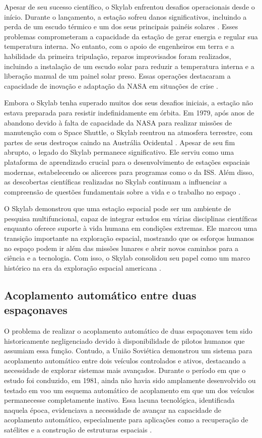 Apesar de seu sucesso científico, o Skylab enfrentou desafios operacionais desde o início. Durante o lançamento, a estação sofreu danos significativos, incluindo a perda de um escudo térmico e um dos seus principais painéis solares \citep{nasaSkylab2}. Esses problemas comprometeram a capacidade da estação de gerar energia e regular sua temperatura interna. No entanto, com o apoio de engenheiros em terra e a habilidade da primeira tripulação, reparos improvisados foram realizados, incluindo a instalação de um escudo solar para reduzir a temperatura interna e a liberação manual de um painel solar preso. Essas operações destacaram a capacidade de inovação e adaptação da NASA em situações de crise \citep{nasaSkylab}.

Embora o Skylab tenha superado muitos dos seus desafios iniciais, a estação não estava preparada para resistir indefinidamente em órbita. Em 1979, após anos de abandono devido à falta de capacidade da NASA para realizar missões de manutenção com o Space Shuttle, o Skylab reentrou na atmosfera terrestre, com partes de seus destroços caindo na Austrália Ocidental \citep{nasaSkylabReentry}. Apesar de seu fim abrupto, o legado do Skylab permanece significativo. Ele serviu como uma plataforma de aprendizado crucial para o desenvolvimento de estações espaciais modernas, estabelecendo os alicerces para programas como o da ISS. Além disso, as descobertas científicas realizadas no Skylab continuam a influenciar a compreensão de questões fundamentais sobre a vida e o trabalho no espaço \citep{nasaSkylab}.

O Skylab demonstrou que uma estação espacial pode ser um ambiente de pesquisa multifuncional, capaz de integrar estudos em várias disciplinas científicas enquanto oferece suporte à vida humana em condições extremas. Ele marcou uma transição importante na exploração espacial, mostrando que os esforços humanos no espaço podem ir além das missões lunares e abrir novos caminhos para a ciência e a tecnologia. Com isso, o Skylab consolidou seu papel como um marco histórico na era da exploração espacial americana \citep{nasaSkylab}.

\subsection{Acoplamento automático entre duas espaçonaves}

O problema de realizar o acoplamento automático de duas espaçonaves tem sido historicamente negligenciado devido à disponibilidade de pilotos humanos que assumiam essa função. Contudo, a União Soviética demonstrou um sistema para acoplamento automático entre dois veículos controlados e ativos, destacando a necessidade de explorar sistemas mais avançados. Durante o período em que o estudo foi conduzido, em 1981, ainda não havia sido amplamente desenvolvido ou testado em voo um esquema automático de acoplamento em que um dos veículos permanecesse completamente inativo. Essa lacuna tecnológica, identificada naquela época, evidenciava a necessidade de avançar na capacidade de acoplamento automático, especialmente para aplicações como a recuperação de satélites e a construção de estruturas espaciais \citep{micheal1981}.

